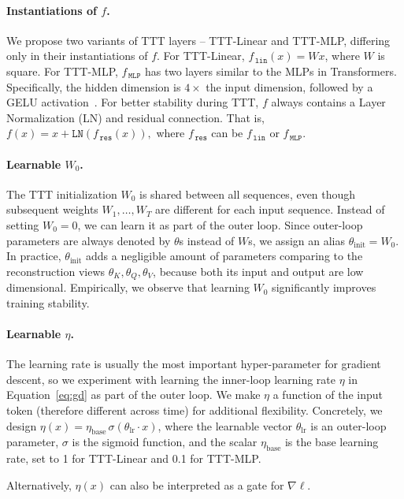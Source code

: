 \documentclass{article}
\begin{document}
\paragraph{Instantiations of $f$.} 
We propose two variants of TTT layers -- TTT-Linear and TTT-MLP, differing only in their instantiations of $f$.
For TTT-Linear, $f_{\,\texttt{lin}}(x) = Wx$, where $W$ is square.
For TTT-MLP, $f_{\,\texttt{MLP}}$ has two layers similar to the MLPs in Transformers.
Specifically, the hidden dimension is $4 \times$ the input dimension, followed by a GELU activation~\cite{hendrycks2016gaussian}.
For better stability during TTT, $f$ always contains a Layer Normalization (LN) and residual connection. That is,
$f(x) = x + \texttt{LN}(f_{\,\texttt{res}}(x)),$
where $f_{\,\texttt{res}}$ can be $f_{\,\texttt{lin}}$ or $f_{\,\texttt{MLP}}$.

\paragraph{Learnable $W_0$.} The TTT initialization $W_0$ is shared between all sequences, even though subsequent weights $W_1,\dots,W_T$ are different for each input sequence. 
Instead of setting $W_0 = 0$, we can learn it as part of the outer loop. 
Since outer-loop parameters are always denoted by $\theta$s instead of $W$s, we assign an alias $\theta_\text{init} = W_0$.
In practice,
$\theta_\text{init}$ adds a negligible amount of parameters comparing to the reconstruction views $\theta_K,\theta_Q,\theta_V$, because both its input and output are low dimensional.
Empirically, we observe that learning $W_0$ significantly improves training stability.

\paragraph{Learnable $\eta$.} The learning rate is usually the most important hyper-parameter for gradient descent, so we experiment with learning the inner-loop learning rate $\eta$ in Equation~\ref{eq:gd} as part of the outer loop.
We make $\eta$ a function of the input token (therefore different across time) for additional flexibility.
Concretely, we design $\eta(x) = \eta_\text{base}\,\sigma(\theta_\text{lr} \cdot x)$, where the learnable vector $\theta_\text{lr}$ is an outer-loop parameter, $\sigma$ is the sigmoid function, and the scalar $\eta_\text{base}$ is the base learning rate, set to 1 for TTT-Linear and 0.1 for TTT-MLP.

Alternatively, $\eta(x)$ can also be interpreted as a gate for $\nabla\ell$.
\end{document}
